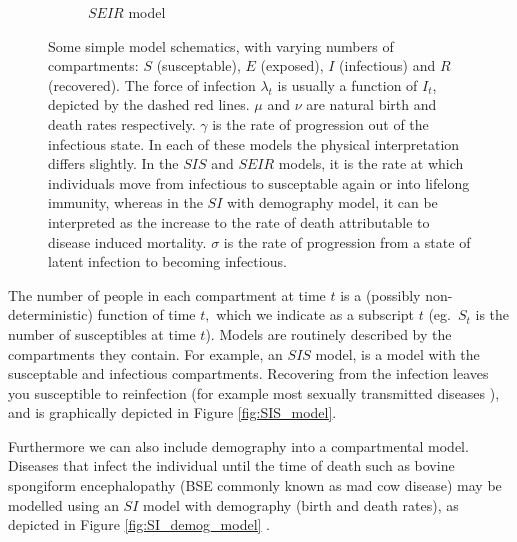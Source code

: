 \begin{figure}[htbp]
\begin{subfigure}[b]{0.45\textwidth}
        \caption{$SEIR$ model}\label{fig:SEIR_model}
    \end{subfigure}%
    \caption{
        Some simple model schematics, with varying numbers of compartments: $S$
        (susceptable), $E$ (exposed), $I$ (infectious) and $R$ (recovered). The
        force of infection $\lambda_t$ is usually a function of $I_t$, depicted
        by the dashed red lines. $\mu$ and $\nu$ are natural birth and death
        rates respectively. $\gamma$ is the rate of progression out of the
        infectious state. In each of these models the physical interpretation
        differs slightly. In the $SIS$ and $SEIR$ models, it is the rate at
        which individuals move from infectious to susceptable again or into
        lifelong immunity, whereas in the $SI$ with demography model, it can be
        interpreted as the increase to the rate of death attributable to
        disease induced mortality. $\sigma$ is the rate of progression from a
        state of latent infection to becoming infectious.
    }\label{fig:simple_models}
\end{figure}

The number of people in each compartment at time $t$ is a (possibly
non-deterministic) function of time $t,$ which we indicate as a subscript $t$
(eg.\ $S_t$ is the number of susceptibles at time $t$). Models are routinely
described by the compartments they contain. For example, an $SIS$ model, is a
model with the susceptable and infectious compartments. Recovering from the
infection leaves you susceptible to reinfection (for example most sexually
transmitted diseases \parencite[56]{keeling_modeling_2008}), and is graphically
depicted in Figure \ref{fig:SIS_model}.

Furthermore we can also include demography into a compartmental model. Diseases
that infect the individual until the time of death such as bovine spongiform
encephalopathy (BSE commonly known as mad cow disease) may be modelled using an
$SI$ model with demography (birth and death rates), as depicted in Figure
\ref{fig:SI_demog_model} \parencite{hagenaars_epidemiological_2006}.

